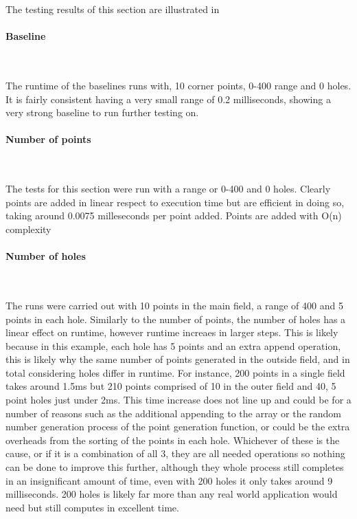 \documentclass[final]{cmpreport_02}
\begin{document}
The testing results of this section are illustrated in 


\paragraph{Baseline}\

The runtime of the baselines runs with, 10 corner points, 0-400 range and 0 holes. 
It is fairly consistent having a very small range of 0.2 milliseconds, showing a very strong baseline to run further testing on.


\paragraph{Number of points} \

The tests for this section were run with a range or 0-400 and 0 holes.
Clearly points are added in linear respect to execution time but are efficient in doing so, taking around 0.0075 milleseconds per point added.
Points are added with O(n) complexity

\paragraph{Number of holes} \

The runs were carried out with 10 points in the main field, a range of 400 and 5 points in each hole.
Similarly to the number of points, the number of holes has a linear effect on runtime, however runtime increaes in larger steps.
This is likely because in this example, each hole has 5 points and an extra append operation, this is likely why the same number of points generated in the outside field, and in total considering holes differ in runtime.
For instance, 200 points in a single field takes around 1.5ms but 210 points comprised of 10 in the outer field and 40, 5 point holes just under 2ms.
This time increase does not line up and could be for a number of reasons such as the additional appending to the array or the random number generation process of the point generation function, or could be the extra overheads from the sorting of the points in each hole.
Whichever of these is the cause, or if it is a combination of all 3, they are all needed operations so nothing can be done to improve this further, although they whole process still completes in an insignificant amount of time, even with 200 holes it only takes around 9 milliseconds.
200 holes is likely far more than any real world application would need but still computes in excellent time.
\end{document}
